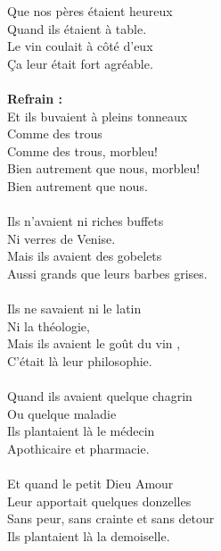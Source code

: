 
 Que nos pères étaient heureux \bissimple
\\Quand ils étaient à table.
\\Le vin coulait à côté d'eux \bissimple
\\Ça leur était fort agréable.
\\\\\textbf{Refrain :}
\\Et ils buvaient à pleins tonneaux
\\Comme des trous
\\Comme des trous, morbleu!
\\Bien autrement que nous, morbleu!
\\Bien autrement que nous.
\\\\Ils n'avaient ni riches buffets \bissimple
\\Ni verres de Venise.
\\Mais ils avaient des gobelets \bissimple
\\Aussi grands que leurs barbes grises.
\\\\Ils ne savaient ni le latin \bissimple
\\Ni la théologie,
\\Mais ils avaient le goût du vin \bissimple,
\\C'était là leur philosophie.
\\\\Quand ils avaient quelque chagrin \bissimple
\\Ou quelque maladie
\\Ils plantaient là le médecin \bissimple
\\Apothicaire et pharmacie.
\\\\Et quand le petit Dieu Amour \bissimple
\\Leur apportait quelques donzelles
\\Sans peur, sans crainte et sans detour \bissimple
\\Ils plantaient là la demoiselle.
